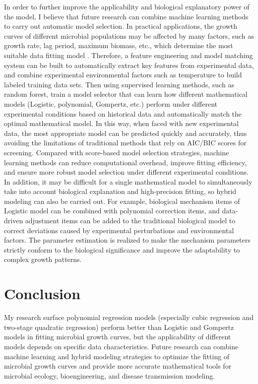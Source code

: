 \documentclass[11pt]{article}
\begin{document}
In order to further improve the applicability and biological explanatory power of the model, I believe that future research can combine machine learning methods to carry out automatic model selection. In practical applications, the growth curves of different microbial populations may be affected by many factors, such as growth rate, lag period, maximum biomass, etc., which determine the most suitable data fitting model \citep{Broswimmer1999}. Therefore, a feature engineering and model matching system can be built to automatically extract key features from experimental data, and combine experimental environmental factors such as temperature to build labeled training data sets. Then using supervised learning methods, such as random forest, train a model selector that can learn how different mathematical models (Logistic, polynomial, Gompertz, etc.) perform under different experimental conditions based on historical data and automatically match the optimal mathematical model. In this way, when faced with new experimental data, the most appropriate model can be predicted quickly and accurately, thus avoiding the limitations of traditional methods that rely on AIC/BIC scores for screening. Compared with score-based model selection strategies, machine learning methods can reduce computational overhead, improve fitting efficiency, and ensure more robust model selection under different experimental conditions. In addition, it may be difficult for a single mathematical model to simultaneously take into account biological explanation and high-precision fitting, so hybrid modeling can also be carried out. For example, biological mechanism items of Logistic model can be combined with polynomial correction items, and data-driven adjustment items can be added to the traditional biological model to correct deviations caused by experimental perturbations and environmental factors. The parameter estimation is realized to make the mechanism parameters strictly conform to the biological significance and improve the adaptability to complex growth patterns.



\section{Conclusion}
My research surface polynomial regression models (especially cubic regression and two-stage quadratic regression) perform better than Logistic and Gompertz models in fitting microbial growth curves, but the applicability of different models depends on specific data characteristics. Future research can combine machine learning and hybrid modeling strategies to optimize the fitting of microbial growth curves and provide more accurate mathematical tools for microbial ecology, bioengineering, and disease transmission modeling.

\newpage

\end{document}
